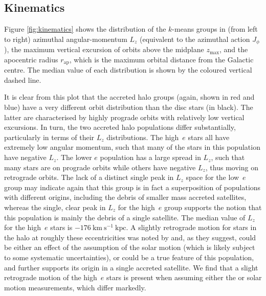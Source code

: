 \subsection{Kinematics}

Figure \ref{fig:kinematics} shows the distribution of the $k$-means
groups in (from left to right) azimuthal angular-momentum $L_z$
(equivalent to the azimuthal action $J_\phi$), the maximum vertical
excursion of orbits above the midplane $z_\mathrm{max}$, and the
apocentric radius $r_\mathrm{ap}$, which is the maximum orbital
distance from the Galactic centre. The median value of each
distribution is shown by the coloured vertical dashed line. 

It is clear from this plot that the accreted halo groups (again,
shown in red and blue) have a very different orbit distribution
than the disc stars (in black).  The latter are characterised by
highly prograde orbits with relatively low vertical excursions.  In
turn, the two accreted halo populations differ substantially,
particularly in terms of their $L_z$ distributions. The high~$e$
stars all have extremely low angular momentum, such that many of
the stars in this population have negative $L_z$. The lower $e$
population has a large spread in $L_z$, such that many stars are
on prograde orbits while others have negative $L_z$, thus moving
on retrograde orbits. The lack of a distinct single peak in $L_z$
space for the low~$e$ group may indicate again that this group is
in fact a superposition of populations with different origins,
including the debris of smaller mass accreted satellites, whereas
the single, clear peak in $L_z$ for the high~$e$ group supports the
notion that this population is mainly the debris of a single
satellite. The median value of $L_z$ for the high~$e$ stars is $-176
\mathrm{\ km\ s^{-1}\ kpc}$.  A slightly retrograde motion for stars
in the halo at roughly these eccentricities was noted by
\citet{2018arXiv180606038H} and, as they suggest, could be either
an effect of the assumption of the solar motion (which is likely
subject to some systematic uncertainties), or could be a true feature
of this population, and further supports its origin in a single
accreted satellite. We find that a slight retrograde motion of the
high~$e$ stars is present when assuming either the
\citet{2010MNRAS.403.1829S} or \citet{2005ApJ...629..268H} solar
motion measurements, which differ markedly.

